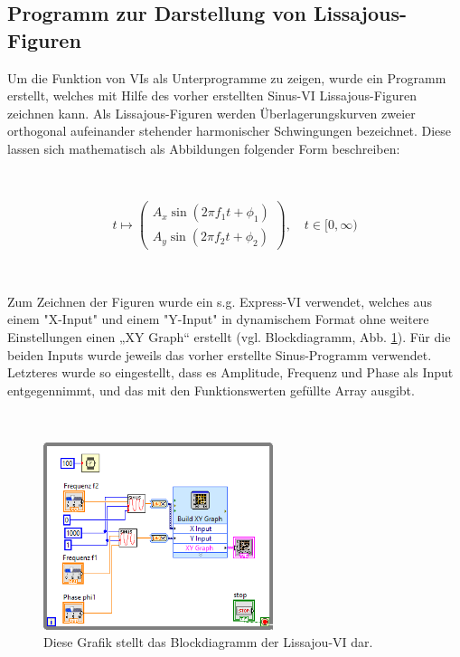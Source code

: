 \subsection{Programm zur Darstellung von Lissajous-Figuren}

Um die Funktion von VIs als Unterprogramme zu zeigen, wurde ein Programm erstellt, welches mit Hilfe des vorher erstellten Sinus-VI Lissajous-Figuren zeichnen kann. Als Lissajous-Figuren werden Überlagerungskurven zweier orthogonal aufeinander stehender harmonischer Schwingungen bezeichnet. Diese lassen sich mathematisch als Abbildungen folgender Form beschreiben:

\

\begin{equation}
 t \mapsto 	\begin{pmatrix}
		 A_x\sin(2\pi f_1 t + \phi_1) \\ 
		 A_y\sin(2\pi f_2 t + \phi_2)
	 \end{pmatrix},
	 \quad	t \in [0,\infty)
\end{equation}

\

Zum Zeichnen der Figuren wurde ein s.g. Express-VI verwendet, welches aus einem "X-Input" und einem "Y-Input" in dynamischem Format ohne weitere Einstellungen einen „XY Graph“ erstellt (vgl. Blockdiagramm, Abb. \ref{fig:LissajouBlock}). Für die beiden Inputs wurde jeweils das vorher erstellte Sinus-Programm verwendet. Letzteres wurde so eingestellt, dass es Amplitude, Frequenz und Phase als Input entgegennimmt, und das mit den Funktionswerten gefüllte Array ausgibt.

\

\begin{figure}[H]
	\centering
	\includegraphics[width=0.6\textwidth]{pic/LisBlock.png}
	\caption{Diese Grafik stellt das Blockdiagramm der Lissajou-VI dar.}
	\label{fig:LissajouBlock}	
\end{figure} 

